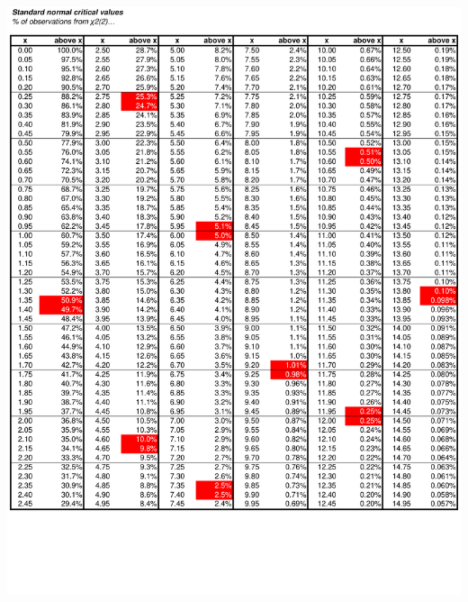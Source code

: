 \documentclass[8pt,letterpaper, landscape]{extarticle} %
\begin{document}
\begin{center}
\includegraphics[height=9.75in, angle=90]{images/cv4}

\end{center}
\end{document}
